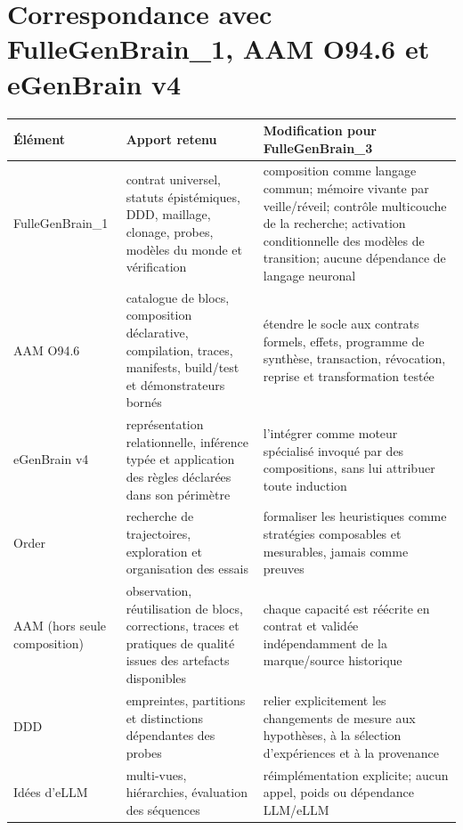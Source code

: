 \documentclass[11pt,a4paper]{article}
\begin{document}
\section{Correspondance avec FulleGenBrain\_1, AAM O94.6 et eGenBrain v4}
\begin{longtable}{p{}p{}p{}}
\toprule Élément & Apport retenu & Modification pour FulleGenBrain\_3 \\
\midrule
FulleGenBrain\_1 & contrat universel, statuts épistémiques, DDD, maillage, clonage, probes, modèles du monde et vérification & composition comme langage commun; mémoire vivante par veille/réveil; contrôle multicouche de la recherche; activation conditionnelle des modèles de transition; aucune dépendance de langage neuronal \\
AAM O94.6 & catalogue de blocs, composition déclarative, compilation, traces, manifests, build/test et démonstrateurs bornés & étendre le socle aux contrats formels, effets, programme de synthèse, transaction, révocation, reprise et transformation testée \\
eGenBrain v4 & représentation relationnelle, inférence typée et application des règles déclarées dans son périmètre & l'intégrer comme moteur spécialisé invoqué par des compositions, sans lui attribuer toute induction \\
Order & recherche de trajectoires, exploration et organisation des essais & formaliser les heuristiques comme stratégies composables et mesurables, jamais comme preuves \\
AAM (hors seule composition) & observation, réutilisation de blocs, corrections, traces et pratiques de qualité issues des artefacts disponibles & chaque capacité est réécrite en contrat et validée indépendamment de la marque/source historique \\
DDD & empreintes, partitions et distinctions dépendantes des probes & relier explicitement les changements de mesure aux hypothèses, à la sélection d'expériences et à la provenance \\
Idées d’eLLM & multi-vues, hiérarchies, évaluation des séquences & réimplémentation explicite; aucun appel, poids ou dépendance LLM/eLLM \\
\bottomrule
\end{longtable}
\end{document}
